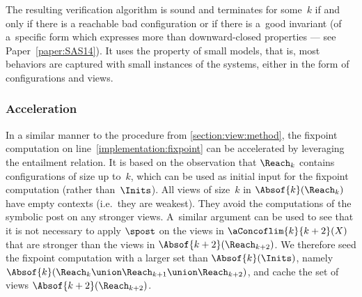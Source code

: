 %
The resulting verification algorithm is sound and terminates for
some~$k$ if and only if there is a reachable bad configuration or if
there is a~good invariant %
(of a~specific form which expresses more than downward-closed
properties --- see Paper~\ref{paper:SAS14}).
%
%
It uses the property of small models, that is, most behaviors are
captured with small instances of the systems, either in the form of
configurations and views.

\subsubsection{Acceleration}
%
%
In a similar manner to the procedure from \ref{section:view:method},
the fixpoint computation on line~\ref{implementation:fixpoint} can be
accelerated by leveraging the entailment relation. %
It is based on the observation that $\Reach_k$ contains configurations
of size up to~$k$, which can be used as initial input for the fixpoint
computation (rather than~$\Inits$).
%
All views of size~$k$ in $\Absof{k}(\Reach_k)$ have empty contexts
(i.e.\ they are weakest). %
They avoid the computations of the symbolic post on any stronger
views.
%
A~similar argument can be used to see that it is not necessary to
apply $\spost$ on the views in $\aConcoflim{k}{k+2}(X)$ that are
stronger than the views in $\Absof{k+2}(\Reach_{k+2})$.
%
We therefore seed the fixpoint computation with a larger set than
$\Absof{k}(\Inits)$, namely
$\Absof{k}(\Reach_k\union\Reach_{k+1}\union\Reach_{k+2})$, and cache
the set of views $\Absof{k+2}(\Reach_{k+2})$.

